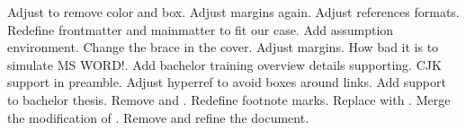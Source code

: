 \markdownRendererUlItem Adjust  to remove color and box.\markdownRendererUlItemEnd 
\markdownRendererUlItem Adjust margins again.\markdownRendererUlItemEnd 
\markdownRendererUlItem Adjust references formats.\markdownRendererUlItemEnd 
\markdownRendererUlItem Redefine frontmatter and mainmatter to fit our case.\markdownRendererUlItemEnd 
\markdownRendererUlItem Add assumption environment.\markdownRendererUlItemEnd 
\markdownRendererUlItem Change the brace in the cover.\markdownRendererUlItemEnd 
\markdownRendererUlEnd \markdownRendererInterblockSeparator
{}
\markdownRendererSectionEnd 
\markdownRendererSectionEnd \markdownRendererSectionBegin
{}\markdownRendererInterblockSeparator
{}\markdownRendererSectionBegin
{}\markdownRendererInterblockSeparator
{}\markdownRendererUlBegin
\markdownRendererUlItem Adjust margins. How bad it is to simulate MS WORD!.\markdownRendererUlItemEnd 
\markdownRendererUlItem Add bachelor training overview details supporting.\markdownRendererUlItemEnd 
\markdownRendererUlItem CJK support in preamble.\markdownRendererUlItemEnd 
\markdownRendererUlItem Adjust hyperref to avoid boxes around links.\markdownRendererUlItemEnd 
\markdownRendererUlEnd \markdownRendererInterblockSeparator
{}
\markdownRendererSectionEnd 
\markdownRendererSectionEnd \markdownRendererSectionBegin
{}\markdownRendererInterblockSeparator
{}\markdownRendererSectionBegin
{}\markdownRendererInterblockSeparator
{}\markdownRendererUlBegin
\markdownRendererUlItem Add support to bachelor thesis.\markdownRendererUlItemEnd 
\markdownRendererUlItem Remove  and .\markdownRendererUlItemEnd 
\markdownRendererUlItem Redefine footnote marks.\markdownRendererUlItemEnd 
\markdownRendererUlItem Replace  with .\markdownRendererUlItemEnd 
\markdownRendererUlItem Merge the modification of .\markdownRendererUlItemEnd 
\markdownRendererUlItem Remove  and refine the document.\markdownRendererUlItemEnd 
